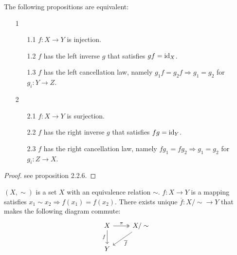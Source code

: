 \begin{proposition}
  The following propositions are equivalent:
  \begin{enumerate}
    \item[1]
    \begin{enumerate}
      \item[1.1] $f: X \to Y$ is injection.
      \item[1.2]  $f$ has the left inverse $g$ that satisfies $gf = \operatorname{id}_{X}$.
      \item[1.3] $f$ has the left cancellation law, namely $g_1 f = g_2 f \Rightarrow g_1 = g_2$ for $g_i: Y \to Z$.
    \end{enumerate}
    \item[2]
    \begin{enumerate}
      \item[2.1] $f: X \to Y$ is surjection.
      \item[2.2] $f$ has the right inverse $g$ that satisfies $fg = \operatorname{id}_{Y}$.
      \item[2.3] $f$ has the right cancellation law, namely $fg_1 = fg_2 \Rightarrow g_1 = g_2$ for $g_i: Z \to X$.  
    \end{enumerate}
  \end{enumerate}
\end{proposition}

\begin{proof}
  see \cite{LWW_AJN} proposition 2.2.6.
\end{proof}





\begin{theorem}
  \label{theorem equiv1}
  $(X, \sim)$ is a set $X$ with an equivalence relation $\sim$. $f: X \to Y$ is a mapping satisfies $x_1 \sim x_2 \Rightarrow f(x_1) = f(x_2)$. There exists unique $\overline{f}: X / \sim \to Y$ that makes the following diagram commute:
  \[
    \begin{tikzcd}
      X \arrow[two heads, r, "\pi"] \arrow[d, "f"'] 
      & X / \sim  \arrow[ld, "\overline{f}"]
      \\
      Y
    \end{tikzcd}
  \]
\end{theorem}




